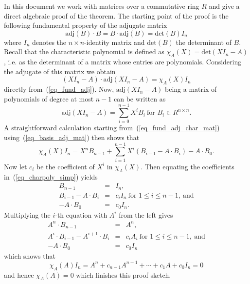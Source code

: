 \documentclass[11pt,a4paper]{article}
\begin{document}
In this document we work with matrices over a commutative ring $R$ and give a direct algebraic
proof of the theorem. The starting point of the proof
is the following fundamental property of the adjugate matrix
\begin{equation}
\mathrm{adj}(B) \cdot B = B \cdot \mathrm{adj}(B) = \mathrm{det}(B) I_n\label{eq_fund_adj}
\end{equation}
where $I_n$ denotes the $n\times n$-identity matrix and $\mathrm{det}(B)$ the determinant of $B$. Recall that the characteristic polynomial is defined as
$\chi_A(X) = \mathrm{det}(X I_n - A)$, i.e. as the determinant of a matrix whose entries are polynomials. Considering
the adjugate of this matrix we obtain
\begin{equation}
(X I_n - A)\cdot\mathrm{adj}(X I_n - A) = \chi_A(X) I_n\label{eq_fund_adj_char_mat}
\end{equation}
directly from~(\ref{eq_fund_adj}). Now, $\mathrm{adj}(X I_n - A)$ being a matrix of polynomials of degree at most $n-1$ can be written as
\begin{equation}
\mathrm{adj}(X I_n - A) = \sum_{i=0}^{n-1} X^i B_i\ \mbox{for $B_i \in R^{n\times n}$}.\label{eq_basis_adj_mat}
\end{equation}
A straightforward calculation starting from~(\ref{eq_fund_adj_char_mat}) using~(\ref{eq_basis_adj_mat}) 
then shows that
\begin{equation}
\chi_A(X) I_n = X^n B_{n-1} + \sum_{i=1}^{n-1} X^i(B_{i-1} - A \cdot B_i) - A\cdot B_0.\label{eq_charpoly_simp}
\end{equation}
Now let $c_i$ be the coefficient of $X^i$ in $\chi_A(X)$. Then equating the coefficients in~(\ref{eq_charpoly_simp}) yields
\begin{eqnarray*}
B_{n-1} & = & I_n,\\
B_{i-1} - A \cdot B_i & = & c_i I_n\ \mbox{for $1\leq i \leq n-1$},\ \mbox{and}\\
-A \cdot B_0 & = & c_0 I_n.
\end{eqnarray*}
Multiplying the $i$-th equation with $A^i$ from the left gives
\begin{eqnarray*}
A^n \cdot B_{n-1} & = & A^n,\\
A^i \cdot B_{i-1} - A^{i+1} \cdot B_i & = & c_i A_i\ \mbox{for $1\leq i \leq n-1$},\ \mbox{and}\\
-A \cdot B_0 & = & c_0 I_n
\end{eqnarray*}
which shows that
\[
\chi_A(A) I_n = A^n + c_{n-1} A^{n-1} + \cdots + c_1 A + c_0 I_n = 0
\]
and hence $\chi_A(A) = 0$ which finishes this proof sketch.
\end{document}
